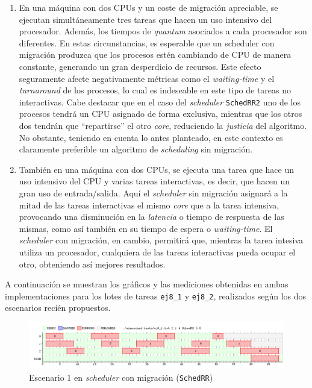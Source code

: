 \begin{enumerate}
    \item En una máquina con dos CPUs y un coste de migración apreciable, se
    ejecutan simultáneamente tres tareas que hacen un uso intensivo del
    procesador. Además, los tiempos de \emph{quantum} asociados a cada
    procesador son diferentes. En estas circunstancias, es esperable que un
    scheduler con migración produzca que los procesos estén cambiando de CPU de
    manera constante, generando un gran desperdicio de recursos. Este efecto
    seguramente afecte negativamente métricas como el \emph{waiting-time} y el
    \emph{turnaround} de los procesos, lo cual es indeseable en este tipo de
    tareas no interactivas. Cabe destacar que en el caso del \emph{scheduler}
    \texttt{SchedRR2} uno de los procesos tendrá un CPU asignado de forma
    exclusiva, mientras que los otros dos tendrán que ``repartirse'' el otro
    \emph{core}, reduciendo la \emph{justicia} del algoritmo. No obstante,
    teniendo en cuenta lo antes planteado, en este contexto es claramente
    preferible un algoritmo de \emph{scheduling} sin migración.

    \item También en una máquina con dos CPUs, se ejecuta una tarea que hace un
    uso intensivo del CPU y varias tareas interactivas, es
    decir, que hacen un gran uso de entrada/salida. Aquí el \emph{scheduler} sin
    migración asignará a la mitad de las tareas interactivas el mismo
    \emph{core} que a la tarea intensiva, provocando una disminución en la 
    \emph{latencia} o tiempo de respuesta de las mismas, como así también en su
    tiempo de espera o \emph{waiting-time}. El \emph{scheduler} con migración,
    en cambio, permitirá que, mientras la tarea intesiva utiliza un procesador, 
    cualquiera de las tareas interactivas pueda ocupar el otro, obteniendo así
    mejores resultados.
\end{enumerate}

A continuación se muestran los gráficos y las mediciones obtenidas en ambas
implementaciones para los lotes de tareas \texttt{ej8\_1} y \texttt{ej8\_2},
realizados según los dos escenarios recién propuestos.

\begin{figure}[H]
    \begin{center}
        \includegraphics[width=1\columnwidth]{imagenes/ej8_1_rr.png}
        \caption{Escenario 1 en \emph{scheduler} con migración (\texttt{SchedRR})}
    \end{center}
\end{figure}

